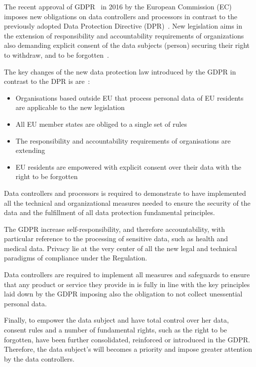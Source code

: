 The recent approval of GDPR~\cite{gdpr} in 2016 by the European Commission (EC)
imposes new obligations on data controllers and processors in contrast to the previously adopted Data Protection Directive (DPR)~\cite{eu-46ec-1995}.
New legislation aims in the extension of responsibility and accountability requirements of organizations also demanding explicit
consent of the data subjects (person) securing their right to withdraw, and to be forgotten~\cite{DBLP:journals/corr/NeisseSF17}.

The key changes of the new data protection law introduced by the GDPR in contrast to the DPR is are~\cite{DBLP:journals/corr/NeisseSF17}:
\begin{itemize}
    \item Organisations based outside EU that process personal data of EU residents are applicable to the new legislation
    \item All EU member states are obliged to a single set of rules
    \item The responsibility and accountability requirements of organisations are extending
    \item EU residents are empowered with explicit consent over their data with the right to be forgotten
\end{itemize}

Data controllers and processors is required to demonstrate to have implemented all the technical and organizational measures needed to ensure the security of the data and the fulfillment of all data protection fundamental principles.

The GDPR increase self-responsibility, and therefore accountability, with particular reference to the processing of sensitive data, such as health and medical data. Privacy lie at the very center of all the new legal and technical paradigms of compliance under the Regulation.

Data controllers are required to implement all measures and safeguards to ensure that any product or service they provide in is fully in line with the key principles laid down by the GDPR imposing also the obligation to not collect unessential personal data.

Finally, to empower the data subject and have total control over her data, consent rules and a number of fundamental rights, such as the right to be forgotten, have been further consolidated, reinforced or introduced in the GDPR. Therefore, the data subject's will becomes a priority and impose greater attention by the data controllers.

